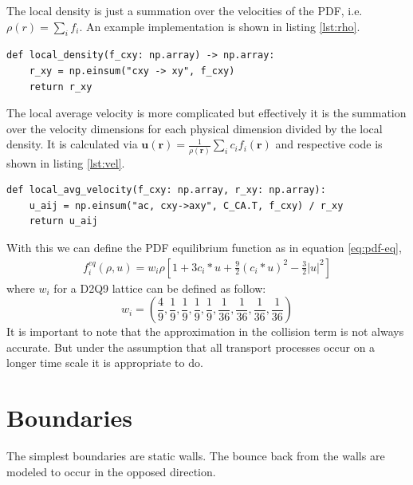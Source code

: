 \documentclass[a4paper,11pt, oneside]{book}
\begin{document}
The local density is just a summation over the velocities of the PDF, i.e. $\rho(r) = \sum_{i} f_{i}$.
An example implementation is shown in listing \ref{lst:rho}.
\begin{center}
\begin{lstlisting}[caption=Implementation of the local density,label=lst:rho, basicstyle=\small]
def local_density(f_cxy: np.array) -> np.array:
    r_xy = np.einsum("cxy -> xy", f_cxy)
    return r_xy
  \end{lstlisting}
\end{center}
The local average velocity is more complicated but effectively it is the summation over the velocity dimensions for each physical dimension divided by the local density.
It is calculated via $\textbf{u}(\textbf{r})=\frac{1}{\rho (\textbf{r})} \sum_{i} c_{i}f_{i}(\textbf{r})$ and respective code is shown in listing \ref{lst:vel}.
\begin{center}
  \begin{lstlisting}[caption=Implementation of the local average velocity.,label=lst:vel, basicstyle=\small]
def local_avg_velocity(f_cxy: np.array, r_xy: np.array):
    u_aij = np.einsum("ac, cxy->axy", C_CA.T, f_cxy) / r_xy
    return u_aij
  \end{lstlisting}
\end{center}
With this we can define the PDF equilibrium function as in equation \ref{eq:pdf-eq},
\begin{equation}
  \label{eq:pdf-eq}
  \begin{aligned}
    f_{i}^{eq} ( \rho , u ) = w_i \rho \left[ 1+3 c_i * u + \frac{9}{2}(c_i * u )^2 - \frac{3}{2} | u |^2 \right]
  \end{aligned}
\end{equation}
where $w_i$ for a D2Q9 lattice can be defined as follow: 
\begin{equation}
w_i = \left( \frac{4}{9}, \frac{1}{9}, \frac{1}{9}, \frac{1}{9}, \frac{1}{9}, \frac{1}{36}, \frac{1}{36}, \frac{1}{36}, \frac{1}{36} \right)
\end{equation}
It is important to note that the approximation in the collision term is not always accurate.
But under the assumption that all transport processes occur on a longer time scale it is appropriate to do.

\section{Boundaries}
The simplest boundaries are static walls. 
The bounce back from the walls are modeled to occur in the opposed direction. 
\end{document}
